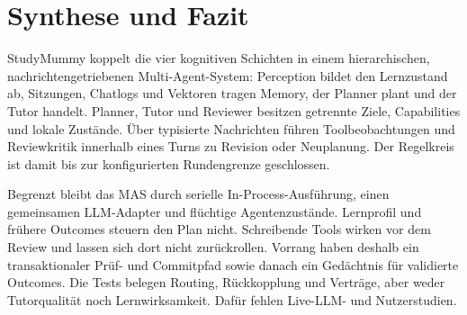 \section*{Synthese und Fazit}

StudyMummy koppelt die vier kognitiven Schichten in einem hierarchischen,
nachrichtengetriebenen Multi-Agent-System: Perception bildet den Lernzustand ab,
Sitzungen, Chatlogs und Vektoren tragen Memory, der Planner plant und der Tutor handelt.
Planner, Tutor und Reviewer besitzen getrennte Ziele, Capabilities und lokale
Zustände. Über typisierte Nachrichten führen Toolbeobachtungen und Reviewkritik
innerhalb eines Turns zu Revision oder Neuplanung. Der Regelkreis ist damit bis
zur konfigurierten Rundengrenze geschlossen.

Begrenzt bleibt das MAS durch serielle In-Process-Ausführung, einen gemeinsamen
LLM-Adapter und flüchtige Agentenzustände. Lernprofil und frühere Outcomes
steuern den Plan nicht. Schreibende Tools wirken vor dem Review und lassen sich
dort nicht zurückrollen. Vorrang haben deshalb ein transaktionaler Prüf- und
Commitpfad sowie danach ein Gedächtnis für validierte Outcomes. Die Tests
belegen Routing, Rückkopplung und Verträge, aber weder Tutorqualität noch
Lernwirksamkeit. Dafür fehlen Live-LLM- und Nutzerstudien.
